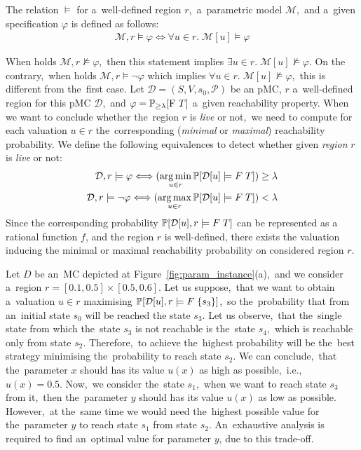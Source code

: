 \begin{definition}
The relation $\models$ for a~well-defined region $r$,~a~parametric model $\mathcal{M}$,~and a~given specification $\varphi$ is defined as follows:
\begin{align*}
    \mathcal{M}, r \models \varphi \Longleftrightarrow \forall u \in r. \; \mathcal{M}[u] \models \varphi
\end{align*}
\end{definition}
\noindent
When holds $\mathcal{M}, r \not\models \varphi$,~then this statement implies $\exists u \in r. \; \mathcal{M}[u] \not\models \varphi$.
On the contrary,~when holds $\mathcal{M}, r \models \neg\varphi$ which implies $\forall u \in r. \; \mathcal{M}[u] \not\models \varphi$,~this is different from the~first case.
Let $\mathcal{D} = (S, V, s_0, \mathcal{P})$ be an pMC, $r$ a~well-defined region for this pMC $\mathcal{D}$,~and $\varphi = \mathbb{P}_{\geq \lambda}[\mathrm{F}\ T]$ a~given reachability property.
When we want to conclude whether the~region $r$ is \textit{live} or not,~we need to compute for each valuation $u \in r$ the~corresponding (\textit{minimal} or \textit{maximal}) reachability probability.
We define the following equivalences to detect whether given \textit{region} $r$ is \textit{live} or not:
\begin{align*}
    \mathcal{D}, r \models \varphi \Longleftrightarrow (\operatorname*{arg\,min}_{u \in r} \mathbb{P}[\mathcal{D}[u] \models F \; T]) \geq \lambda \\
    \mathcal{D}, r \models \neg\varphi \Longleftrightarrow (\operatorname*{arg\,max}_{u \in r} \mathbb{P}[\mathcal{D}[u] \models F \; T]) < \lambda \\
\end{align*}
Since the corresponding probability $\mathbb{P}[\mathcal{D}[u], r \models F \; T]$ can be represented as a rational function $f$, and the region $r$ is well-defined, there exists the valuation inducing the minimal or maximal reachability probability on considered region $r$.

\begin{example}
Let $D$ be an~MC depicted at Figure~\ref{fig:param_instance}(a),~and we  consider a~region $r = [0.1, 0.5] \times [0.5, 0.6]$.
Let us suppose,~that we want to obtain a~valuation $u \in r$ maximising $\mathbb{P}[\mathcal{D}[u], r \models F \; \{s_3 \}]$,~so the~probability that from an~initial state $s_0$ will be reached the state $s_3$.
Let us observe,~that the~single state from which the~state $s_3$ is not reachable is the~state $s_4$,~which is reachable only from state $s_2$.
Therefore,~to achieve the~highest probability will be the~best strategy minimising the~probability to reach state $s_2$.
We can conclude,~that the~parameter $x$ should has its value $u(x)$ as high as possible,~i.e.,~$u(x)= 0.5$.
Now,~we consider the~state $s_1$,~when we want to reach state $s_3$ from it,~then the~parameter $y$ should has its value $u(x)$ as low as possible.
However,~at the~same time we would need the~highest possible value for the~parameter $y$ to reach state $s_1$ from state $s_2$.
An~exhaustive analysis is required to find an~optimal value for parameter $y$, due to this trade-off.
\end{example}

